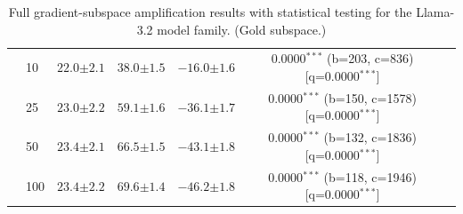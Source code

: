 \begin{table}[h!]
\begin{tabular}{l l cccc c}
 & 10 & $22.0 {\scriptstyle \pm 2.1}$ & $38.0 {\scriptstyle \pm 1.5}$ & $-16.0 {\scriptstyle \pm 1.6}$ & 0.0000$^{***}$ (b=203, c=836) [q=0.0000$^{***}$] &  \\
 & 25 & $23.0 {\scriptstyle \pm 2.2}$ & $59.1 {\scriptstyle \pm 1.6}$ & $-36.1 {\scriptstyle \pm 1.7}$ & 0.0000$^{***}$ (b=150, c=1578) [q=0.0000$^{***}$] &  \\
 & 50 & $23.4 {\scriptstyle \pm 2.1}$ & $66.5 {\scriptstyle \pm 1.5}$ & $-43.1 {\scriptstyle \pm 1.8}$ & 0.0000$^{***}$ (b=132, c=1836) [q=0.0000$^{***}$] &  \\
 & 100 & $23.4 {\scriptstyle \pm 2.2}$ & $69.6 {\scriptstyle \pm 1.4}$ & $-46.2 {\scriptstyle \pm 1.8}$ & 0.0000$^{***}$ (b=118, c=1946) [q=0.0000$^{***}$] &  \\
\bottomrule
\end{tabular}
\caption{Full gradient-subspace amplification results with statistical testing for the Llama-3.2 model family. (Gold subspace.)}
\label{tab:gradsubspace_amp_stats_gold_llama}
\end{table}

